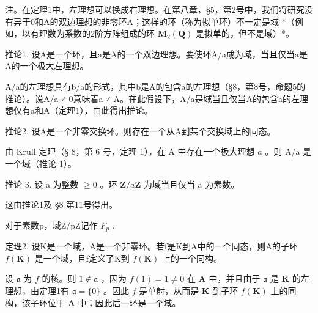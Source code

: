 注。在定理1中，左理想可以换成右理想。在第八章，§5，第2号中，我们将研究没有异于0和A的双边理想的非零环A；这样的环（称为拟单环）不一定是域 *（例如，以有理数为系数的2阶方阵组成的环 \(\mathbf{M}_2(\mathbf{Q})\) 是拟单的，但不是域）*。

推论1. 设A是一个环，且a是A的一个双边理想。要使环A/a成为域，当且仅当a是A的一个极大左理想。

A/a的左理想具有b/a的形式，其中b是A的包含a的左理想（§8，第8号，命题5的推论）。说A/a ≠ 0意味着a ≠ A。在此假设下，A/a是域当且仅当A的包含a的左理想仅有a和A（定理1），由此得出推论。

推论2. 设A是一个非零交换环。则存在一个从A到某个交换域上的同态。

由 Krull 定理（§ 8，第 6 号，定理 1），在 A 中存在一个极大理想 \(a\) 。则 A/a 是一个域（推论 1）。

推论 3. 设 a 为整数 \(\geqslant 0\) 。环 \(\mathbf{Z} / a\mathbf{Z}\) 为域当且仅当 a 为素数。

这由推论1及 §8 第11号得出。

对于素数p，域Z/pZ记作 \(F_{p}\) .

定理2. 设K是一个域，A是一个非零环。若f是K到A中的一个同态，则A的子环 \(f(\mathbf{K})\) 是一个域，且f定义了K到 \(f(\mathbf{K})\) 上的一个同构。

设 \(\mathfrak{a}\) 为 \(f\) 的核。则 \(1 \notin \mathfrak{a}\) ，因为 \(f(1) = 1 \neq 0\) 在 \(\mathbf{A}\) 中，并且由于 \(\mathfrak{a}\) 是 \(\mathbf{K}\) 的左理想，由定理1有 \(\mathfrak{a} = \{0\}\) 。因此 \(f\) 是单射，从而是 \(\mathbf{K}\) 到子环 \(f(\mathbf{K})\) 上的同构，该子环位于 \(\mathbf{A}\) 中；因此后一环是一个域。

